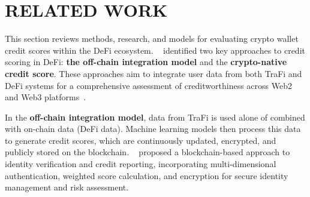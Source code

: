 \documentclass[runningheads]{llncs}
\begin{document}
\section{RELATED WORK}\label{section2}

This section reviews methods, research, and models for evaluating crypto wallet credit scores within the DeFi ecosystem. 
\citeauthor{packin2023decentralized}~\cite{packin2023decentralized} identified two key approaches to credit scoring in DeFi: \textbf{the off-chain integration model} and the \textbf{crypto-native credit score}. These approaches aim to integrate user data from both TraFi and DeFi systems for a comprehensive assessment of creditworthiness across Web2 and Web3 platforms~\cite{voshmgir2020token}. 




In the \textbf{off-chain integration model}, data from TraFi is used alone of combined with on-chain data (DeFi data). Machine learning models then process this data to generate credit scores, which are continuously updated, encrypted, and publicly stored on the blockchain. %
\citeauthor{zhu2020blockchain}~\cite{zhu2020blockchain} proposed a blockchain-based approach to identity verification and credit reporting, incorporating multi-dimensional authentication, weighted score calculation, and encryption for secure identity management and risk assessment. 
\end{document}
